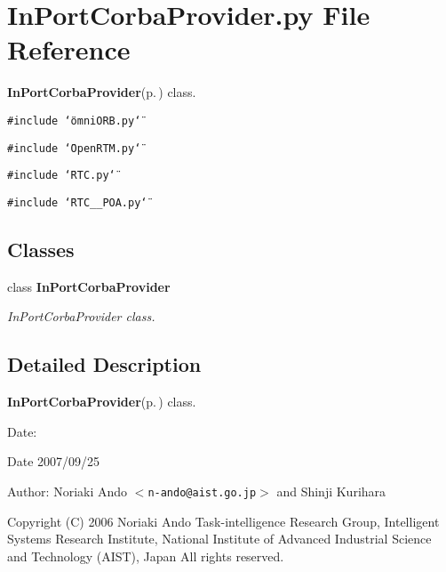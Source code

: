 \section{In\-Port\-Corba\-Provider.py File Reference}
\label{InPortCorbaProvider_8py}
{\bf In\-Port\-Corba\-Provider}{\rm (p.\,\pageref{classInPortCorbaProvider})} class. 

{\tt \#include \char`\"{}omni\-ORB.py\char`\"{}}\par
{\tt \#include \char`\"{}Open\-RTM.py\char`\"{}}\par
{\tt \#include \char`\"{}RTC.py\char`\"{}}\par
{\tt \#include \char`\"{}RTC\_\-\_\-POA.py\char`\"{}}\par
\subsection*{Classes}
\begin{CompactItemize}
\item 
class {\bf In\-Port\-Corba\-Provider}
\begin{CompactList}\small\item\em In\-Port\-Corba\-Provider class. \item\end{CompactList}\end{CompactItemize}


\subsection{Detailed Description}
{\bf In\-Port\-Corba\-Provider}{\rm (p.\,\pageref{classInPortCorbaProvider})} class. 

\begin{Desc}
\item[Date:]\begin{Desc}
\item[Date]2007/09/25 \end{Desc}
\end{Desc}
\begin{Desc}
\item[Author:]Noriaki Ando $<${\tt n-ando@aist.go.jp}$>$ and Shinji Kurihara\end{Desc}
Copyright (C) 2006 Noriaki Ando Task-intelligence Research Group, Intelligent Systems Research Institute, National Institute of Advanced Industrial Science and Technology (AIST), Japan All rights reserved.